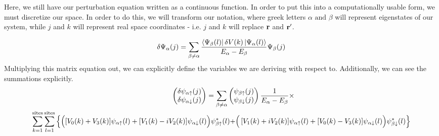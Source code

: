 \documentclass[10pt]{revtex4-1}
\newcommand{\bfr}{{\bf r}}
\newcommand{\ua}{\uparrow}
\newcommand{\da}{\downarrow}
\begin{document}
Here, we still have our perturbation equation written as a continuous function.
In order to put this into a computationally usable form, we must discretize our space.
In order to do this, we will transform our notation, where greek letters $\alpha \text{ and } \beta$ will represent eigenstates of our system, while $j$ and $k$ will represent real space coordinates - i.e. $j$ and $k$ will replace $\bfr$ and $\bfr'$.

\begin{equation}
  \delta \Psi_{\alpha}(j) \\
  = \sum_{\beta \neq \alpha} \frac{\bra{\Psi_{\beta}(l)} \delta V(k) \ket{\Psi_{\alpha}(l)}}
  {E_{\alpha} - E_{\beta}}
  \Psi_{\beta}(j)
\end{equation}
Multiplying this matrix equation out, we can explicitly define the variables we are deriving with respect to.
Additionally, we can see the summations explicitly.
\begin{multline}
  \hspace{1.2cm}
  \begin{pmatrix}
    \delta \psi_{\alpha \ua}(j) \\
    \delta \psi_{\alpha \da}(j) \\
  \end{pmatrix}
  = \sum_{\beta \neq \alpha}
  \begin{pmatrix}
    \psi_{\beta \ua}(j) \\
    \psi_{\beta \da}(j) \\
  \end{pmatrix}
  \frac{1}{E_{\alpha} - E_{\beta}} \times \\
  \sum_{k=1}^{\text{sites}} \sum_{l=1}^{\text{sites}} \left\{ \left([V_0(k) + V_3(k)]\psi_{\alpha \ua}(l) + [V_1(k) - i V_2(k)]\psi_{\alpha \da}(l)\Big{)}\psi_{\beta \ua}^*(l) +  \right([V_1(k) + i V_2(k)]\psi_{\alpha \ua}(l) + [V_0(k) -  V_3(k)]\psi_{\alpha \da}(l)\Big{)} \psi_{\beta \da}^*(l) \right \}
\end{multline}
\end{document}
